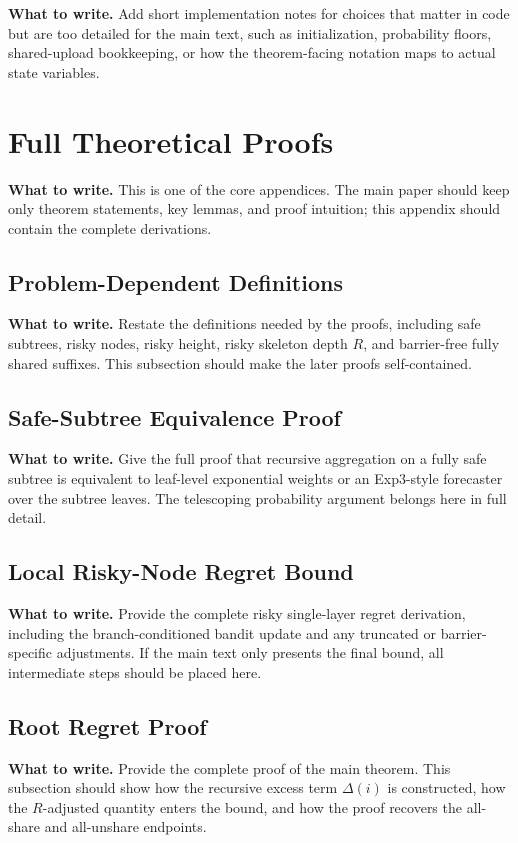 \documentclass{article}
\newcommand{\towrite}[1]{\noindent\textbf{What to write.} #1}
\begin{document}
\towrite{Add short implementation notes for choices that matter in code but are too detailed for the main text, such as initialization, probability floors, shared-upload bookkeeping, or how the theorem-facing notation maps to actual state variables.}

\section{Full Theoretical Proofs}

\towrite{This is one of the core appendices. The main paper should keep only theorem statements, key lemmas, and proof intuition; this appendix should contain the complete derivations.}

\subsection{Problem-Dependent Definitions}

\towrite{Restate the definitions needed by the proofs, including safe subtrees, risky nodes, risky height, risky skeleton depth $R$, and barrier-free fully shared suffixes. This subsection should make the later proofs self-contained.}

\subsection{Safe-Subtree Equivalence Proof}

\towrite{Give the full proof that recursive aggregation on a fully safe subtree is equivalent to leaf-level exponential weights or an Exp3-style forecaster over the subtree leaves. The telescoping probability argument belongs here in full detail.}

\subsection{Local Risky-Node Regret Bound}

\towrite{Provide the complete risky single-layer regret derivation, including the branch-conditioned bandit update and any truncated or barrier-specific adjustments. If the main text only presents the final bound, all intermediate steps should be placed here.}

\subsection{Root Regret Proof}

\towrite{Provide the complete proof of the main theorem. This subsection should show how the recursive excess term $\Delta(i)$ is constructed, how the $R$-adjusted quantity enters the bound, and how the proof recovers the all-share and all-unshare endpoints.}
\end{document}
